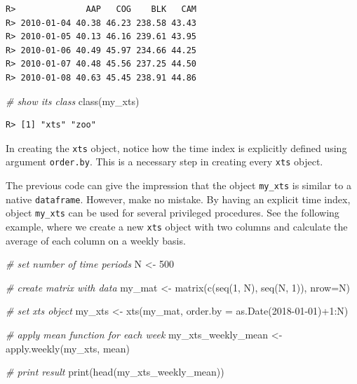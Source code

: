 \documentclass[
  12pt,
]{book}
\newenvironment{Shaded}{\begin{snugshade}}{\end{snugshade}}
\newcommand{\AttributeTok}[1]{\textcolor[rgb]{0.61,0.61,0.61}{#1}}
\newcommand{\CommentTok}[1]{\textcolor[rgb]{0.37,0.37,0.37}{\textit{#1}}}
\newcommand{\DecValTok}[1]{\textcolor[rgb]{0.06,0.06,0.06}{#1}}
\newcommand{\FunctionTok}[1]{\textcolor[rgb]{0,0,0}{#1}}
\newcommand{\NormalTok}[1]{#1}
\newcommand{\OtherTok}[1]{\textcolor[rgb]{0.37,0.37,0.37}{#1}}
\newcommand{\SpecialCharTok}[1]{\textcolor[rgb]{0,0,0}{#1}}
\newcommand{\StringTok}[1]{\textcolor[rgb]{0.5,0.5,0.5}{#1}}
\begin{document}
\begin{verbatim}
R>              AAP   COG    BLK   CAM
R> 2010-01-04 40.38 46.23 238.58 43.43
R> 2010-01-05 40.13 46.16 239.61 43.95
R> 2010-01-06 40.49 45.97 234.66 44.25
R> 2010-01-07 40.48 45.56 237.25 44.50
R> 2010-01-08 40.63 45.45 238.91 44.86
\end{verbatim}

\begin{Shaded}
\begin{Highlighting}[]
\CommentTok{\# show its class}
\FunctionTok{class}\NormalTok{(my\_xts)}
\end{Highlighting}
\end{Shaded}

\begin{verbatim}
R> [1] "xts" "zoo"
\end{verbatim}

In creating the \texttt{xts} object, notice how the time index is explicitly defined using argument \texttt{order.by}. This is a necessary step in creating every \texttt{xts} object.

The previous code can give the impression that the object \texttt{my\_xts} is similar to a native \texttt{dataframe}. However, make no mistake. By having an explicit time index, object \texttt{my\_xts} can be used for several privileged procedures. See the following example, where we create a new \texttt{xts} object with two columns and calculate the average of each column on a weekly basis.

\begin{Shaded}
\begin{Highlighting}[]
\CommentTok{\# set number of time periods}
\NormalTok{N }\OtherTok{\textless{}{-}} \DecValTok{500}

\CommentTok{\# create matrix with data}
\NormalTok{my\_mat }\OtherTok{\textless{}{-}} \FunctionTok{matrix}\NormalTok{(}\FunctionTok{c}\NormalTok{(}\FunctionTok{seq}\NormalTok{(}\DecValTok{1}\NormalTok{, N), }\FunctionTok{seq}\NormalTok{(N, }\DecValTok{1}\NormalTok{)), }\AttributeTok{nrow=}\NormalTok{N)}

\CommentTok{\# set xts object}
\NormalTok{my\_xts }\OtherTok{\textless{}{-}} \FunctionTok{xts}\NormalTok{(my\_mat, }\AttributeTok{order.by =} \FunctionTok{as.Date}\NormalTok{(}\StringTok{\textquotesingle{}2018{-}01{-}01\textquotesingle{}}\NormalTok{)}\SpecialCharTok{+}\DecValTok{1}\SpecialCharTok{:}\NormalTok{N)}

\CommentTok{\# apply mean function for each week}
\NormalTok{my\_xts\_weekly\_mean }\OtherTok{\textless{}{-}} \FunctionTok{apply.weekly}\NormalTok{(my\_xts, mean)}

\CommentTok{\# print result}
\FunctionTok{print}\NormalTok{(}\FunctionTok{head}\NormalTok{(my\_xts\_weekly\_mean))}
\end{Highlighting}
\end{Shaded}
\end{document}
